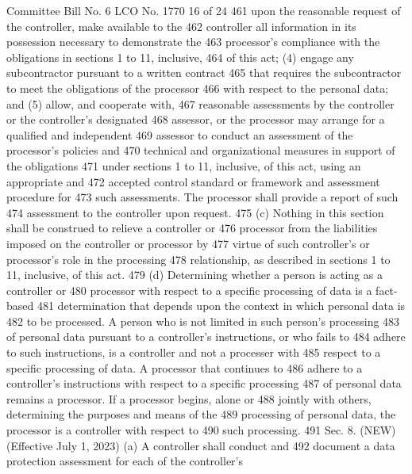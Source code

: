 Committee Bill No. 6
LCO No. 1770 16 of 24
461 upon the reasonable request of the controller, make available to the
462 controller all information in its possession necessary to demonstrate the
463 processor's compliance with the obligations in sections 1 to 11, inclusive,
464 of this act; (4) engage any subcontractor pursuant to a written contract
465 that requires the subcontractor to meet the obligations of the processor
466 with respect to the personal data; and (5) allow, and cooperate with,
467 reasonable assessments by the controller or the controller's designated
468 assessor, or the processor may arrange for a qualified and independent
469 assessor to conduct an assessment of the processor's policies and
470 technical and organizational measures in support of the obligations
471 under sections 1 to 11, inclusive, of this act, using an appropriate and
472 accepted control standard or framework and assessment procedure for
473 such assessments. The processor shall provide a report of such
474 assessment to the controller upon request.
475 (c) Nothing in this section shall be construed to relieve a controller or
476 processor from the liabilities imposed on the controller or processor by
477 virtue of such controller's or processor's role in the processing
478 relationship, as described in sections 1 to 11, inclusive, of this act.
479 (d) Determining whether a person is acting as a controller or
480 processor with respect to a specific processing of data is a fact-based
481 determination that depends upon the context in which personal data is
482 to be processed. A person who is not limited in such person's processing
483 of personal data pursuant to a controller's instructions, or who fails to
484 adhere to such instructions, is a controller and not a processer with
485 respect to a specific processing of data. A processor that continues to
486 adhere to a controller's instructions with respect to a specific processing
487 of personal data remains a processor. If a processor begins, alone or
488 jointly with others, determining the purposes and means of the
489 processing of personal data, the processor is a controller with respect to
490 such processing.
491 Sec. 8. (NEW) (Effective July 1, 2023) (a) A controller shall conduct and
492 document a data protection assessment for each of the controller's 

